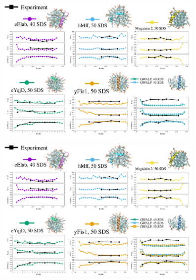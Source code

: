 \documentclass{beamer}
\begin{document}
\addtocounter{framenumber}{-1}
\begin{frame}
\begin{center}


\vspace{0.5cm}


\includegraphics[height=7cm]{all_pep2.pdf}
\end{center}
\end{frame}


\addtocounter{framenumber}{-1}
\begin{frame}
\begin{center}


\vspace{0.5cm}


\includegraphics[height=7cm]{all_pep1.pdf}
\end{center}
\end{frame}
\end{document}

